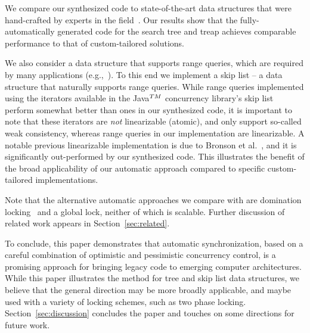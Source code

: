 We compare our synthesized code to state-of-the-art data structures
that were hand-crafted by experts in the field~\cite{DrachslerVY2014,BronsonCCO2010,ConcurrentSkipList,fraser2004practical}.
Our results show that the
fully-automatically generated code for the search tree and treap
achieves comparable performance to that of
custom-tailored solutions.

We also consider a data structure that supports range queries, which are required by
many applications (e.g.,~\cite{levelDB,FerroJKRY14}). To this end we implement a skip list -- a data structure that naturally supports range queries.
While range queries implemented using the iterators available in the Java$^{\sc TM}$ concurrency library's skip list~\cite{ConcurrentSkipList} perform
somewhat better than ones in our synthesized code, it is important to note that these iterators are \emph{not}
linearizable (atomic), and only support so-called weak consistency, whereas range queries in our implementation are linearizable.
A notable previous linearizable implementation is due to Bronson et al.~\cite{BronsonCCO2010},
and it is significantly out-performed by our synthesized code.
%
This illustrates the benefit of the broad applicability
of our automatic approach compared to specific custom-tailored implementations.

Note that the alternative automatic approaches we compare with are domination locking~\cite{Gueta2011} and a global lock, neither of which is scalable.
Further discussion of related work appears in Section~\ref{sec:related}.

To conclude, this paper demonstrates that automatic synchronization, based on a careful combination of optimistic and
pessimistic concurrency control, is a promising approach for bringing legacy code to emerging computer architectures.
While this paper illustrates the method for tree and skip list data structures, we believe that the general direction may be more broadly applicable, and maybe used with a variety of locking schemes, such as two phase locking.
Section~\ref{sec:discussion} concludes the paper and touches on some directions for future work. 